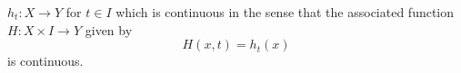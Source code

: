 \documentclass[preview]{standalone}
\begin{document}
\begin{center}
$h_t : X \to Y$ for $t \in I$ which is continuous in the sense that the associated function $H : X \times I \to Y$ given by $$H(x,t) = h_t(x)$$ is continuous.
\end{center}
\end{document}
